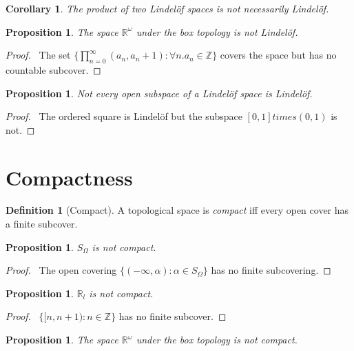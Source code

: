 \documentclass{report}
\let\qed\relax
\newtheorem{prop}[lm]{Proposition}
\newtheorem{cor}{Corollary}[lm]
\theoremstyle{definition}
\newtheorem{df}[lm]{Definition}
\begin{document}
\begin{cor}
  The product of two Lindel\"{o}f spaces is not necessarily Lindel\"{o}f.
\end{cor}

\begin{prop}
	The space $\mathbb{R}^\omega$ under the box topology is not Lindel\"{o}f.
\end{prop}

\begin{proof}
	\pf\ The set $\{ \prod_{n=0}^\infty (a_n, a_n + 1) : \forall n. a_n \in \mathbb{Z} \}$ covers the space but has no countable subcover. \qed
\end{proof}

\begin{prop}
  Not every open subspace of a Lindel\"{o}f space is Lindel\"{o}f.
\end{prop}

\begin{proof}
  \pf\ The ordered square is Lindel\"{o}f but the subspace $[0,1]
  times (0,1)$ is not. \qed
\end{proof}

  \section{Compactness}

  \begin{df}[Compact]
    A topological space is \emph{compact} iff every open cover has a finite
    subcover.
  \end{df}

   \begin{prop}
     \label{prop:topology:compact:S_omega}
  $S_\Omega$ is not compact.
 \end{prop}

 \begin{proof}
   \pf\ The open covering $\{ (- \infty, \alpha) : \alpha \in S_\Omega \}$ has
   no finite subcovering. \qed
 \end{proof}

  \begin{prop}
   $\mathbb{R}_l$ is not compact.
 \end{prop}

 \begin{proof}
   \pf\ $\{ [n, n+1) : n \in \mathbb{Z} \}$ has no finite subcover. \qed
 \end{proof}

 \begin{prop}
   The space $\mathbb{R}^\omega$ under the box topology is not compact.
 \end{prop}
\end{document}
